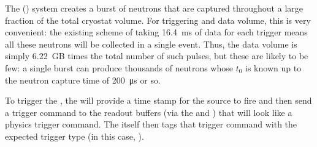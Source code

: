 The  () system creates a burst of neutrons that
are captured throughout a large fraction of the total cryostat volume. For triggering and data volume, this is very convenient: the existing scheme of taking \SI{16.4}{\milli\s} of data for each trigger means all these neutrons will be collected in a single  event.%
Thus, the data volume is simply \num{6.22}~GB times the total number of such pulses, but these are likely to be few: a single burst can produce thousands of neutrons whose $t_0$ is known up to the neutron capture time of \SI{200}{\micro\s} or so.

To trigger the , the  will provide a time stamp for the source to fire and then send a trigger command to the  readout buffers (via the  and ) that will look like a physics trigger command.  The  itself then tags that trigger command with the expected trigger type (in this case, ).

